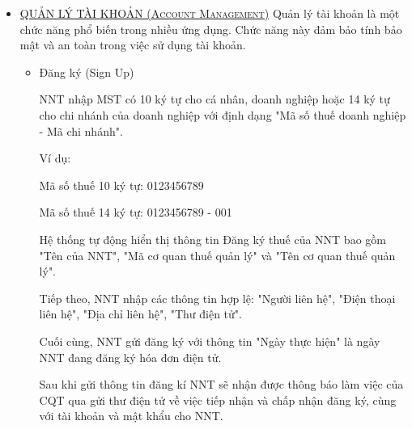 \begin{itemize}

\item \underline{\textsc{QUẢN LÝ TÀI KHOẢN (Account       Management)}}
Quản lý tài khoản là một chức năng phổ biến trong nhiều ứng dụng. Chức năng này đảm bảo tính bảo mật và an toàn trong việc sử dụng tài khoản.

\begin{itemize}

\item Đăng ký (Sign Up)


NNT nhập MST có 10 ký tự cho cá nhân, doanh nghiệp hoặc 14 ký tự cho chi nhánh của doanh nghiệp với định dạng "Mã số thuế doanh nghiệp - Mã chi nhánh".

Ví dụ:

Mã số thuế 10 ký tự: 0123456789

Mã số thuế 14 ký tự: 0123456789 - 001

Hệ thống tự động hiển thị thông tin Đăng ký thuế của NNT bao gồm "Tên của NNT", "Mã cơ quan thuế quản lý" và "Tên cơ quan thuế quản lý".

Tiếp theo, NNT nhập các thông tin hợp lệ: "Người liên hệ", "Điện thoại liên hệ", "Địa chỉ liên hệ", "Thư điện tử".

Cuối cùng, NNT gửi đăng ký với thông tin "Ngày thực hiện" là ngày NNT đang đăng ký hóa đơn điện tử.

Sau khi gửi thông tin đăng kí NNT sẽ nhận được thông báo làm việc của CQT qua gửi thư điện tử về việc tiếp nhận và chấp nhận đăng ký, cùng với tài khoản và mật khẩu cho NNT.








\end{itemize}
\end{itemize}
